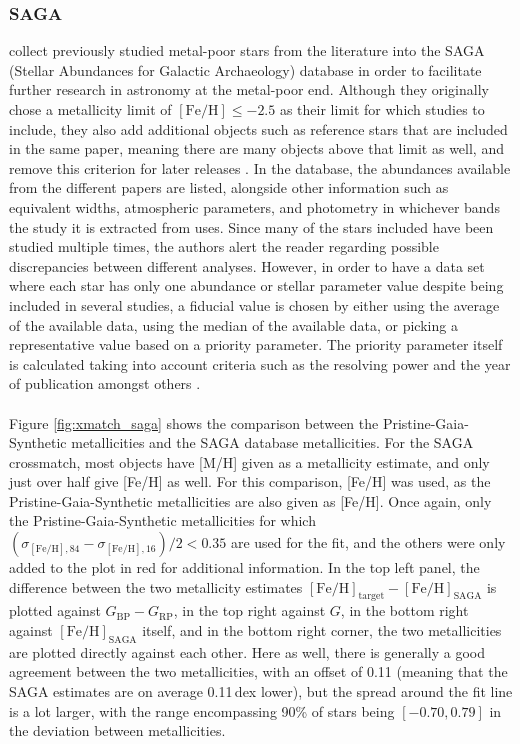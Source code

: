 \documentclass[a4paper,11pt]{article}
\begin{document}
\subsubsection*{SAGA}
\citet{saga} collect previously studied metal-poor stars from the literature into the SAGA (Stellar Abundances for Galactic Archaeology) database in order to facilitate further research in astronomy at the metal-poor end. Although they originally chose a metallicity limit of $\mathrm{[Fe/H]}\leq-2.5$ as their limit for which studies to include, they also add additional objects such as reference stars that are included in the same paper, meaning there are many objects above that limit as well, and remove this criterion for later releases \citep{suda17}. In the database, the abundances available from the different papers are listed, alongside other information such as equivalent widths, atmospheric parameters, and photometry in whichever bands the study it is extracted from uses. Since many of the stars included have been studied multiple times, the authors alert the reader regarding possible discrepancies between different analyses. However, in order to have a data set where each star has only one abundance or stellar parameter value despite being included in several studies, a fiducial value is chosen by either using the average of the available data, using the median of the available data, or picking a representative value based on a priority parameter. The priority parameter itself is calculated taking into account criteria such as the resolving power and the year of publication amongst others \citep{suda17}.\\ \\
%
Figure \ref{fig:xmatch_saga} shows the comparison between the Pristine-Gaia-Synthetic metallicities and the SAGA database metallicities. For the SAGA crossmatch, most objects have [M/H] given as a metallicity estimate, and only just over half give [Fe/H] as well. For this comparison, [Fe/H] was used, as the Pristine-Gaia-Synthetic metallicities are also given as [Fe/H]. Once again, only the Pristine-Gaia-Synthetic metallicities for which $(\sigma_{\mathrm{[Fe/H]},84}-\sigma_{\mathrm{[Fe/H]},16})/2<0.35$ are used for the fit, and the others were only added to the plot in red for additional information. In the top left panel, the difference between the two metallicity estimates $\mathrm{[Fe/H]_{target}}-\mathrm{[Fe/H]_{SAGA}}$ is plotted against $G_\mathrm{BP}-G_\mathrm{RP}$, in the top right against $G$, in the bottom right against $\mathrm{[Fe/H]_{SAGA}}$ itself, and in the bottom right corner, the two metallicities are plotted directly against each other. Here as well, there is generally a good agreement between the two metallicities, with an offset of 0.11 (meaning that the SAGA estimates are on average 0.11\,dex lower), but the spread around the fit line is a lot larger, with the range encompassing 90\% of stars being $[-0.70,0.79]$ in the deviation between metallicities.
\end{document}
